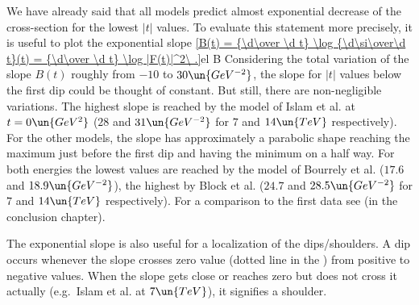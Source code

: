 

We have already said that all models predict almost exponential decrease of the cross-section for the lowest $|t|$ values. To evaluate this statement more precisely, it is useful to plot the exponential slope
\eqref{B(t) = {\d\over \d t} \log {\d\si\over\d t}(t) = {\d\over \d t} \log |F(t)|^2\ .}{el B}
Considering the total variation of the slope $B(t)$ roughly from $-10$ to $30\un{GeV^{-2}}$, the slope for $|t|$ values below the first dip could be thought of constant. But still, there are non-negligible variations. The highest slope is reached by the model of Islam et al. at $t=0\un{GeV^2}$ ($28$ and $31\un{GeV^{-2}}$ for $7$ and $14\un{TeV}$ respectively). For the other models, the slope has approximately a parabolic shape reaching the maximum just before the first dip and having the minimum on a half way. For both energies the lowest values are reached by the model of Bourrely et al. ($17.6$ and $18.9\un{GeV^{-2}}$), the highest by Block et al. ($24.7$ and $28.5\un{GeV^{-2}}$ for $7$ and $14\un{TeV}$ respectively). For a comparison to the first  data see  (in the conclusion chapter).

The exponential slope is also useful for a localization of the dips/shoulders. A dip occurs whenever the slope crosses zero value (dotted line in the ) from positive to negative values. When the slope gets close or reaches zero but does not cross it actually (e.g.~Islam et al. at $7\un{TeV}$), it signifies a shoulder.



